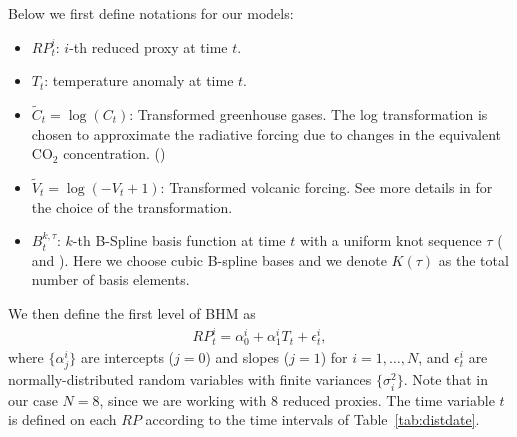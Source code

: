 \documentclass[12pt]{amsart}
\theoremstyle{plain}
\theoremstyle{definition}
\theoremstyle{remark}
\begin{document}
Below we first define notations for our models:
\begin{itemize}
\item $RP_t^i$: $i$-th reduced proxy at time $t$.
  
\item $T_t$: temperature anomaly at time $t$.
  
\item $\tilde C_t = \log (C_t)$: Transformed greenhouse gases. The log
  transformation is chosen to approximate the radiative forcing due to changes
  in the equivalent CO$_2$ concentration. (\cite{Barboza2014})
  
\item $\tilde V_t = \log (-V_t+1)$: Transformed volcanic forcing. See more details in \cite{Barboza2014} for the choice of the transformation.
  
\item $B_t^{k,\tau}$: $k$-th B-Spline basis function at time $t$ with a uniform knot
  sequence $\tau$ (\cite{DeBoor2001} and \cite{Ramsay2005}). Here we choose
  cubic B-spline bases and we denote $K(\tau)$ as the total number of basis elements.  
\end{itemize}
We then define the first level of BHM as
\begin{align*}
RP_t^i=\alpha_0^i+\alpha_1^iT_t+\epsilon^i_t,  
\end{align*}
where $\{\alpha^i_j\}$ are intercepts ($j=0$) and slopes ($j=1$) for $i=1,\ldots,N$,  and $\epsilon^i_t$ are normally-distributed random variables with finite variances
$\{\sigma^2_i\}$. Note that in our case $N=8$, since we are working with 8
reduced proxies. The time variable $t$ is defined on each $RP$ according to the
time intervals of Table~\ref{tab:distdate}. 
\end{document}
